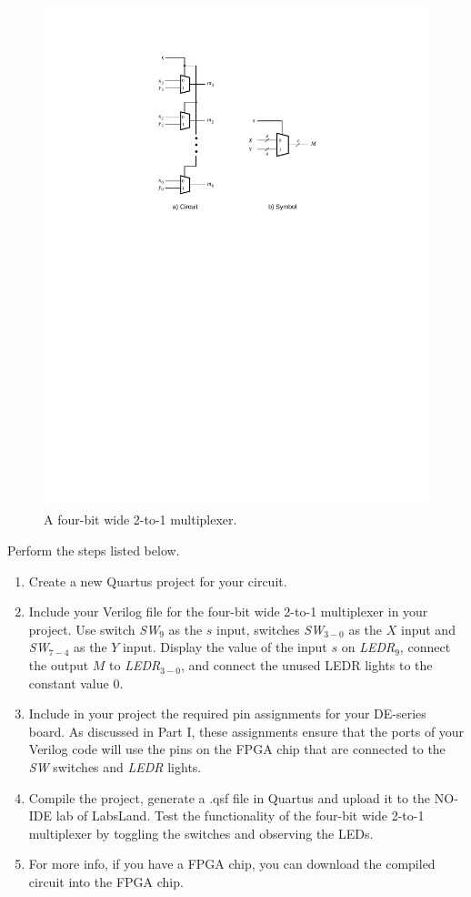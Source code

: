 \documentclass[epsfig,10pt,fullpage]{article}
\begin{document}
\begin{figure}[H]
	\begin{center}
		\includegraphics[scale=.8]{figures/figure3.pdf}
	\end{center}
\caption{A four-bit wide 2-to-1 multiplexer.}
\label{fig:3}
\end{figure}

Perform the steps listed below.
\begin{enumerate}
\item Create a new Quartus project for your circuit.
\item Include your Verilog file for the four-bit wide 2-to-1 multiplexer 
in your project. Use switch {\it SW}$_{9}$ as the $s$ input, switches
{\it SW}$_{3-0}$ as the $X$ input and 
{\it SW}$_{7-4}$ as the $Y$ input. Display the value of the input $s$ on {\it LEDR}$_9$,
connect the output $M$ to {\it LEDR}$_{3-0}$, and connect the unused LEDR lights to the constant value 0.
\item Include in your project the required pin assignments for your DE-series board. As discussed
in Part I, these assignments ensure that the ports of your Verilog code will use the pins 
on the FPGA chip that are connected to the {\it SW} switches and {\it LEDR} lights. 
\item Compile the project, generate a .qsf file in Quartus and upload it to the NO-IDE lab of LabsLand.
Test the functionality of the 
four-bit wide 2-to-1 multiplexer by toggling the switches and observing the LEDs.
\item For more info, if you have a FPGA chip, you can download the compiled circuit into the FPGA chip.
\end{enumerate}
\end{document}
